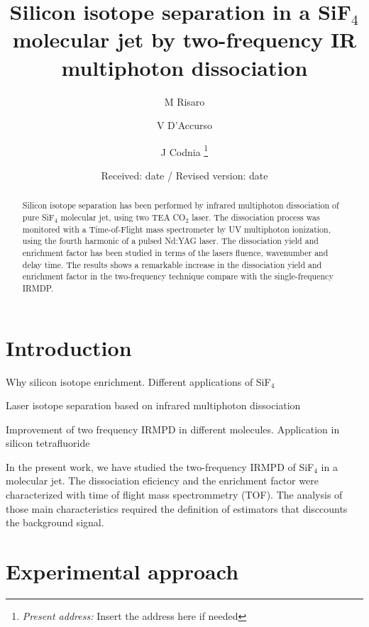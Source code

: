 \documentclass[global,twocolumn]{svjour}
\begin{document}
\title{Silicon isotope separation in a SiF$_{4}$ molecular jet by two-frequency IR multiphoton dissociation}
	\author{M Risaro \and V D'Accurso \and J Codnia%
		\thanks{\emph{Present address:} Insert the address here if needed}%
	}                     %
	\offprints{}          %
	\date{Received: date / Revised version: date}
	\maketitle
	\begin{abstract}
		Silicon isotope separation has been performed by infrared multiphoton dissociation of pure SiF$_{4}$ molecular jet, using two TEA CO$_{2}$ laser. The dissociation process was monitored with a Time-of-Flight mass spectrometer by UV multiphoton ionization, using the fourth harmonic of a pulsed Nd:YAG laser. The dissociation yield and enrichment factor has been studied in terms of the lasers fluence, wavenumber and delay time. The results shows a remarkable increase in the dissociation yield and enrichment factor in the two-frequency technique compare with the single-frequency IRMDP.
	\end{abstract}
\section{Introduction}
\label{intro}
Why silicon isotope enrichment. Different applications of SiF$_{4}$

Laser isotope separation based on infrared multiphoton dissociation

Improvement of two frequency IRMPD in different molecules. Application in silicon tetrafluoride

In the present work, we have studied the two-frequency IRMPD of SiF$_{4}$ in a molecular jet. The dissociation eficiency and the enrichment factor were characterized with time of flight mass spectrommetry (TOF). The analysis of those main characteristics required the definition of estimators that disccounts the background signal.  
\section{Experimental approach}
\label{sec:1}
\end{document}
